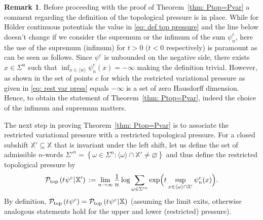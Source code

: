 \documentclass[11pt,reqno]{amsart}
\theoremstyle{plain}
\theoremstyle{definition}
\newtheorem{remark}[theorem]{Remark}
\newcommand{\X}{{\mathbb X}}
\newcommand{\cP}{\mathcal{P}}
\newcommand{\ts}{\hspace{0.5pt}}
\newcommand{\myfrac}[2]{\frac{\raisebox{-2pt}{$#1$}}
      {\raisebox{0.5pt}{$#2$}}}
\begin{document}
\begin{remark}
Before proceeding with the proof of Theorem~\ref{thm: Ptop=Pvar} a comment regarding the definition of the topological pressure is in place. While for H\"older continuous potentials the value in \eqref{eq: def top pressure} and the line below doesn't change if we consider the supremum or the infimum of the sum $\psi_n^c$, here the use of the supremum (infimum) for $t>0$ ($t<0$ respectively) is paramount as can be seen as follows. Since $\psi^c$ is unbounded on the negative side, there exists $x\in \Sigma^n$ such that $\inf_{x\in\langle w\rangle} \psi_n^c(x)=-\infty$ making the definition trivial. However, as shown in \cite{fan_generalized_2020} the set of points $c$ for which the restricted variational pressure as given in \eqref{eq: rest var press} equals $-\infty$ is a set of zero Hausdorff dimension. Hence, to obtain the statement of Theorem~\ref{thm: Ptop=Pvar}, indeed the choice of the infimum and supremum matters. 
\end{remark}



The next step in proving Theorem~\ref{thm: Ptop=Pvar} is to associate the restricted variational pressure with a restricted topological pressure. 
For a closed subshift $\X'\subseteq\X$ that is invariant under the
left shift, let us define the set of admissible $n$-words $\Sigma'^n=\left\{\omega\in\Sigma^n\colon \langle\omega\rangle \cap \X'\neq \varnothing\right\}$ and thus define the restricted topological pressure by
\[
 \cP_{\operatorname{top}}\left(t\ts \psi^c \ts | \ts \X'\right) \, := 
  \lim_{n\to\infty}\myfrac{1}{n}\log\sum_{\omega\in\Sigma'^{n}}
   \exp
  \Bigl(t\ts \sup_{x\in\langle\omega\rangle\cap\X'}\psi^{c}_{n}(x)\Bigr) .
\]
 By definition,
$\cP_{\operatorname{top}}\left(t\ts \psi^c\right)= \cP_{\operatorname{top}}\left(t\ts \psi^c \ts | \ts \X\right)$ (assuming the limit exits, otherwise analogous statements hold for the upper and lower (restricted) pressure).
\end{document}
